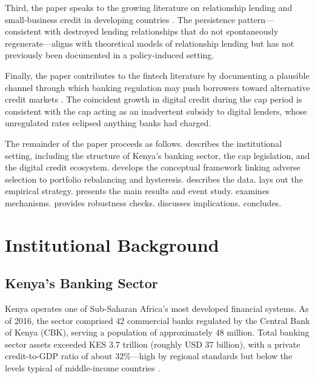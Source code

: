 \documentclass[12pt]{article}
\begin{document}
Third, the paper speaks to the growing literature on relationship lending and small-business credit in developing countries \citep{beck2005financial, banerjee2013miracle, petersen1994benefits}. The persistence pattern---consistent with destroyed lending relationships that do not spontaneously regenerate---aligns with theoretical models of relationship lending \citep{boot2000can, bolton2016relationship} but has not previously been documented in a policy-induced setting.

Finally, the paper contributes to the fintech literature by documenting a plausible channel through which banking regulation may push borrowers toward alternative credit markets \citep{jack2014risk, suri2017long, bharadwaj2019fintech, mbiti2011mobile}. The coincident growth in digital credit during the cap period is consistent with the cap acting as an inadvertent subsidy to digital lenders, whose unregulated rates eclipsed anything banks had charged.

The remainder of the paper proceeds as follows.  describes the institutional setting, including the structure of Kenya's banking sector, the cap legislation, and the digital credit ecosystem.  develops the conceptual framework linking adverse selection to portfolio rebalancing and hysteresis.  describes the data.  lays out the empirical strategy.  presents the main results and event study.  examines mechanisms.  provides robustness checks.  discusses implications.  concludes.


\section{Institutional Background}
\label{sec:background}

\subsection{Kenya's Banking Sector}

Kenya operates one of Sub-Saharan Africa's most developed financial systems. As of 2016, the sector comprised 42 commercial banks regulated by the Central Bank of Kenya (CBK), serving a population of approximately 48 million. Total banking sector assets exceeded KES 3.7 trillion (roughly USD 37 billion), with a private credit-to-GDP ratio of about 32\%---high by regional standards but below the levels typical of middle-income countries \citep{beck2005financial, demirguc2012financial}.
\end{document}
